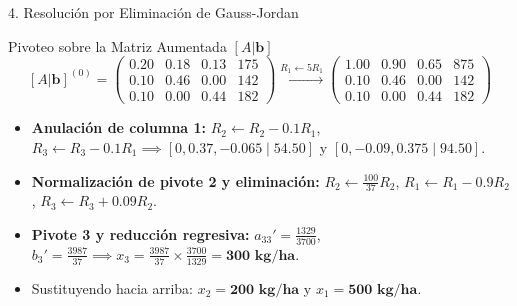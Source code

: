 \documentclass[
  spanish,
  aspectratio=169,
  xcolor={dvipsnames,table}
]{beamer}
\begin{document}
\begin{frame}{4. Resolución por Eliminación de Gauss-Jordan}
  \begin{block}{Pivoteo sobre la Matriz Aumentada $[A|\mathbf{b}]$}
    $$[A|\mathbf{b}]^{(0)} = \left(\begin{array}{ccc|c}
      0.20 & 0.18 & 0.13 & 175 \\
      0.10 & 0.46 & 0.00 & 142 \\
      0.10 & 0.00 & 0.44 & 182
    \end{array}\right)
    \xrightarrow{R_1 \leftarrow 5R_1}
    \left(\begin{array}{ccc|c}
      1.00 & 0.90 & 0.65 & 875 \\
      0.10 & 0.46 & 0.00 & 142 \\
      0.10 & 0.00 & 0.44 & 182
    \end{array}\right)$$
  \end{block}
  \begin{itemize}
    \item \textbf{Anulación de columna 1:} $R_2 \leftarrow R_2 - 0.1R_1$, $R_3 \leftarrow R_3 - 0.1R_1 \implies [0, 0.37, -0.065 \mid 54.50]$ y $[0, -0.09, 0.375 \mid 94.50]$.
    \item \textbf{Normalización de pivote 2 y eliminación:} $R_2 \leftarrow \frac{100}{37}R_2$, $R_1 \leftarrow R_1 - 0.9R_2$, $R_3 \leftarrow R_3 + 0.09R_2$.
    \item \textbf{Pivote 3 y reducción regresiva:} $a_{33}' = \frac{1329}{3700}$, $b_3' = \frac{3987}{37} \implies x_3 = \frac{3987}{37} \times \frac{3700}{1329} = \mathbf{300\text{ kg/ha}}$.
    \item Sustituyendo hacia arriba: $x_2 = \mathbf{200\text{ kg/ha}}$ y $x_1 = \mathbf{500\text{ kg/ha}}$.
  \end{itemize}
\end{frame}
\end{document}
